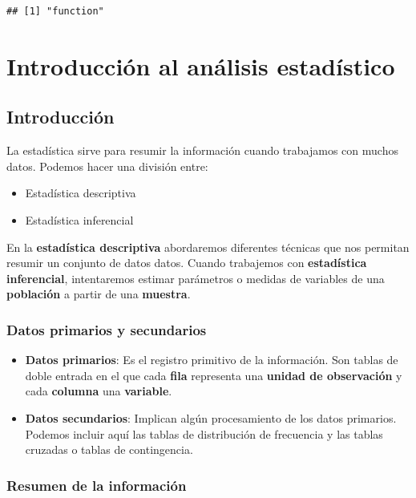 \documentclass[spanish,]{book}
\providecommand{\tightlist}{%
  \setlength{\itemsep}{0pt}\setlength{\parskip}{0pt}}
\begin{document}
\begin{verbatim}
## [1] "function"
\end{verbatim}

\part{Introducción al análisis
estadístico}\label{part-introduccion-al-analisis-estadistico}

\chapter{Introducción}\label{introduccion}

La estadística sirve para resumir la información cuando trabajamos con
muchos datos. Podemos hacer una división entre:

\begin{itemize}
\tightlist
\item
  Estadística descriptiva\\
\item
  Estadística inferencial
\end{itemize}

En la \textbf{estadística descriptiva} abordaremos diferentes técnicas
que nos permitan resumir un conjunto de datos datos. Cuando trabajemos
con \textbf{estadística inferencial}, intentaremos estimar parámetros o
medidas de variables de una \textbf{población} a partir de una
\textbf{muestra}.

\section{Datos primarios y
secundarios}\label{datos-primarios-y-secundarios}

\begin{itemize}
\item
  \textbf{Datos primarios}: Es el registro primitivo de la información.
  Son tablas de doble entrada en el que cada \textbf{fila} representa
  una \textbf{unidad de observación} y cada \textbf{columna} una
  \textbf{variable}.
\item
  \textbf{Datos secundarios}: Implican algún procesamiento de los datos
  primarios. Podemos incluir aquí las tablas de distribución de
  frecuencia y las tablas cruzadas o tablas de contingencia.
\end{itemize}

\section{Resumen de la información}\label{resumen-de-la-informacion}
\end{document}

